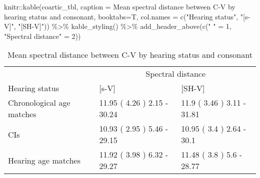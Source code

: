 \documentclass[
]{article}
\newenvironment{Shaded}{\begin{snugshade}}{\end{snugshade}}
\newcommand{\AttributeTok}[1]{\textcolor[rgb]{0.77,0.63,0.00}{#1}}
\newcommand{\DecValTok}[1]{\textcolor[rgb]{0.00,0.00,0.81}{#1}}
\newcommand{\FunctionTok}[1]{\textcolor[rgb]{0.00,0.00,0.00}{#1}}
\newcommand{\NormalTok}[1]{#1}
\newcommand{\OtherTok}[1]{\textcolor[rgb]{0.56,0.35,0.01}{#1}}
\newcommand{\SpecialCharTok}[1]{\textcolor[rgb]{0.00,0.00,0.00}{#1}}
\newcommand{\StringTok}[1]{\textcolor[rgb]{0.31,0.60,0.02}{#1}}
\begin{document}
\begin{Shaded}
\begin{Highlighting}[]
\NormalTok{knitr}\SpecialCharTok{::}\FunctionTok{kable}\NormalTok{(coartic\_tbl, }\AttributeTok{caption =} \StringTok{\textquotesingle{}Mean spectral distance between C{-}V by hearing status and consonant\textquotesingle{}}\NormalTok{, }
             \AttributeTok{booktabs=}\NormalTok{T,}
             \AttributeTok{col.names =} \FunctionTok{c}\NormalTok{(}\StringTok{"Hearing status"}\NormalTok{, }\StringTok{"[s{-}V]"}\NormalTok{, }\StringTok{"[SH{-}V]"}\NormalTok{)) }\SpecialCharTok{\%\textgreater{}\%} 
  \FunctionTok{kable\_styling}\NormalTok{() }\SpecialCharTok{\%\textgreater{}\%} 
  \FunctionTok{add\_header\_above}\NormalTok{(}\FunctionTok{c}\NormalTok{(}\StringTok{" "} \OtherTok{=} \DecValTok{1}\NormalTok{, }\StringTok{"Spectral distance"} \OtherTok{=} \DecValTok{2}\NormalTok{))}
\end{Highlighting}
\end{Shaded}

\begin{table}

\caption{\label{tab:acoustic-descrip}Mean spectral distance between C-V by hearing status and consonant}
\centering
\begin{tabular}[t]{lll}
\toprule
\multicolumn{1}{c}{ } & \multicolumn{2}{c}{Spectral distance} \\
\cmidrule(l{3pt}r{3pt}){2-3}
Hearing status & [s-V] & [SH-V]\\
\midrule
Chronological age matches & 11.95 ( 4.26 ) 2.15 - 30.24 & 11.9 ( 3.46 ) 3.11 - 31.81\\
CIs & 10.93 ( 2.95 ) 5.46 - 29.15 & 10.95 ( 3.4 ) 2.64 - 30.1\\
Hearing age matches & 11.92 ( 3.98 ) 6.32 - 29.27 & 11.48 ( 3.8 ) 5.6 - 28.77\\
\bottomrule
\end{tabular}
\end{table}
\end{document}
